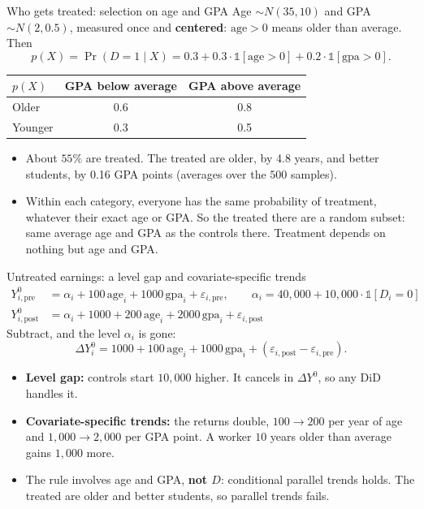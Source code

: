 \documentclass[
  11pt,
  ignorenonframetext,
  aspectratio=169,
]{beamer}
\providecommand{\tightlist}{%
  \setlength{\itemsep}{0pt}\setlength{\parskip}{0pt}}
\begin{document}
\begin{frame}{Who gets treated: selection on age and GPA}
\protect{}\label{who-gets-treated-selection-on-age-and-gpa}
Age \(\sim N(35, 10)\) and GPA \(\sim N(2, 0.5)\), measured once and
\textbf{centered}: \(\text{age} > 0\) means older than average. Then \[
p(X) = \Pr(D = 1 \mid X) = 0.3 + 0.3 \cdot \mathds{1}[\text{age} > 0] + 0.2 \cdot \mathds{1}[\text{gpa} > 0] .
\]

\begin{center}\small
\begin{tabular}{lcc}
\toprule
$p(X)$ & GPA below average & GPA above average \\
\midrule
Older & 0.6 & 0.8 \\
Younger & 0.3 & 0.5 \\
\bottomrule
\end{tabular}
\end{center}

\begin{itemize}
\tightlist
\item
  About \(55\%\) are treated. The treated are older, by 4.8 years, and
  better students, by 0.16 GPA points (averages over the \(500\)
  samples).
\item
  Within each category, everyone has the same probability of treatment,
  whatever their exact age or GPA. So the treated there are a random
  subset: same average age and GPA as the controls there. Treatment
  depends on nothing but age and GPA.
\end{itemize}
\end{frame}

\begin{frame}{Untreated earnings: a level gap and covariate-specific
trends}
\protect{}\label{untreated-earnings-a-level-gap-and-covariate-specific-trends}
\[
\begin{aligned}
Y^0_{i,\text{pre}} &= \alpha_i + 100\,\text{age}_i + 1000\,\text{gpa}_i + \varepsilon_{i,\text{pre}}, \qquad \alpha_i = 40{,}000 + 10{,}000 \cdot \mathds{1}[D_i = 0] \\
Y^0_{i,\text{post}} &= \alpha_i + 1000 + 200\,\text{age}_i + 2000\,\text{gpa}_i + \varepsilon_{i,\text{post}}
\end{aligned}
\] Subtract, and the level \(\alpha_i\) is gone: \[
\Delta Y^0_i = 1000 + 100\,\text{age}_i + 1000\,\text{gpa}_i + (\varepsilon_{i,\text{post}} - \varepsilon_{i,\text{pre}}) .
\]

\begin{itemize}
\tightlist
\item
  \textbf{Level gap:} controls start \(10{,}000\) higher. It cancels in
  \(\Delta Y^0\), so any DiD handles it.
\item
  \textbf{Covariate-specific trends:} the returns double,
  \(100 \to 200\) per year of age and \(1{,}000 \to 2{,}000\) per GPA
  point. A worker \(10\) years older than average gains \(1{,}000\)
  more.
\item
  The rule involves age and GPA, \textbf{not \(D\)}: conditional
  parallel trends holds. The treated are older and better students, so
  parallel trends fails.
\end{itemize}
\end{frame}
\end{document}
